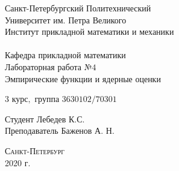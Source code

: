 \documentclass[a4]{article}
\begin{document}
\def\contentsname{\LARGE{Содержание}}
\thispagestyle{empty}
\begin{center} 
\vspace{2cm} 
{\Large \sc Санкт-Петербургский Политехнический}\\
\vspace{2mm}
{\Large \sc Университет} им. {\Large\sc Петра Великого}\\
\vspace{1cm}
{\large \sc Институт прикладной математики и механики\\ 
\vspace{0.5mm}
\textsc{}}\\ 
\vspace{0.5mm}
{\large\sc Кафедра прикладной математики}\\
\vspace{15mm}
{\huge \sc Лабораторная работа №$4$\\
\vspace{4mm}
Эмпирические функции и ядерные оценки
\vspace{6mm}
 }
\vspace*{2mm}
\vspace{1cm}

{\sc $3$ курс$,$ группа $3630102/70301$}

\vspace{2cm} 
Студент \hfill Лебедев К.С.\\
\vspace{1cm}
Преподаватель \hfill Баженов А. Н.\\
\vspace{20mm} 

\end{center} 
\begin{center}
\vfill {\large\textsc{Санкт-Петербург}}\\ 
2020 г.
\end{center}

\end{document}
